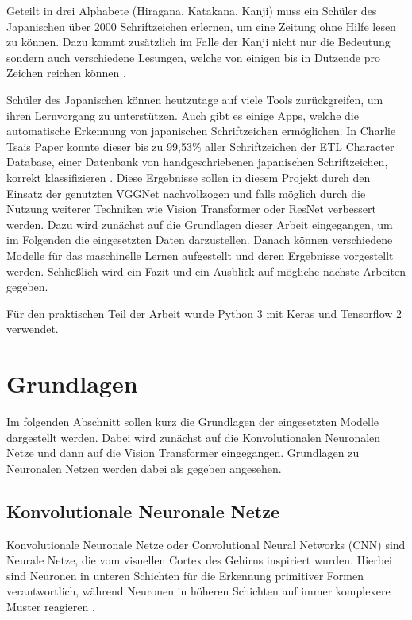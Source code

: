 \documentclass[twoside,a4paper]{IEEEtran}
\begin{document}
Geteilt in drei Alphabete (Hiragana, Katakana, Kanji) muss ein Schüler des Japanischen über 2000 Schriftzeichen erlernen, um eine Zeitung ohne Hilfe lesen zu können. Dazu kommt zusätzlich im Falle der Kanji nicht nur die Bedeutung sondern auch verschiedene Lesungen, welche von einigen bis in Dutzende pro Zeichen reichen können \cite{ABOUT_JAPANESE}.

Schüler des Japanischen können heutzutage auf viele Tools zurückgreifen, um ihren Lernvorgang zu unterstützen. Auch gibt es einige Apps, welche die automatische Erkennung von japanischen Schriftzeichen ermöglichen. In Charlie Tsais Paper \cite{RHC} konnte dieser bis zu 99,53\% aller Schriftzeichen der ETL Character Database, einer Datenbank von handgeschriebenen japanischen Schriftzeichen, korrekt klassifizieren \cite{RHC}. Diese Ergebnisse sollen in diesem Projekt durch den Einsatz der genutzten VGGNet nachvollzogen und falls möglich durch die Nutzung weiterer Techniken wie Vision Transformer oder ResNet verbessert werden. Dazu wird zunächst auf die Grundlagen dieser Arbeit eingegangen, um im Folgenden die eingesetzten Daten darzustellen. Danach können verschiedene Modelle für das maschinelle Lernen aufgestellt und deren Ergebnisse vorgestellt werden. Schließlich wird ein Fazit und ein Ausblick auf mögliche nächste Arbeiten gegeben.

Für den praktischen Teil der Arbeit wurde Python 3 mit Keras und Tensorflow 2 verwendet.
\section{Grundlagen}
Im folgenden Abschnitt sollen kurz die Grundlagen der eingesetzten Modelle dargestellt werden. Dabei wird zunächst auf die Konvolutionalen Neuronalen Netze und dann auf die Vision Transformer eingegangen. Grundlagen zu Neuronalen Netzen werden dabei als gegeben angesehen.
\subsection{Konvolutionale Neuronale Netze} %
Konvolutionale Neuronale Netze oder Convolutional Neural Networks (CNN) sind Neurale Netze, die vom visuellen Cortex des Gehirns inspiriert wurden. Hierbei sind Neuronen in unteren Schichten für die Erkennung primitiver Formen verantwortlich, während Neuronen in höheren Schichten auf immer komplexere Muster reagieren \cite[S.360]{MACHINE_LEARNING}. 
\end{document}
